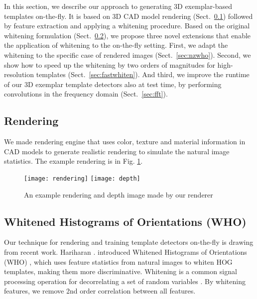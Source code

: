 In this section, we describe our approach to generating 3D
exemplar-based templates on-the-fly. It is based on 3D CAD model
rendering (Sect.~\ref{sec:rendering}) followed by feature extraction
and applying a whitening procedure. Based on the original whitening
formulation (Sect.~\ref{sec:who}), we propose three novel extensions that
enable the application of whitening to the on-the-fly setting.
%
First, we adapt the whitening to the specific case of rendered
images (Sect.~\ref{sec:nzwho}). Second, we show how to speed up the
whitening by two orders of magnitudes for high-resolution templates
(Sect.~\ref{sec:fastwhiten}). And third, we improve the runtime of our
3D exemplar template detectors also at test time, by performing
convolutions in the frequency domain (Sect.~\ref{sec:fft}).


\subsection{Rendering}
\label{sec:rendering}
We made rendering engine that uses color, texture and material information in
CAD models to generate realistic rendering to simulate the natural image
statistics. The example rendering is
in Fig. \ref{fig:rendering}. 

\begin{figure}[t]
  \begin{center}
     \texttt{[image: rendering]}
     \texttt{[image: depth]}
  \end{center}
  \caption{An example rendering and depth image made by our renderer}
  \label{fig:rendering}
\end{figure}


\subsection{Whitened Histograms of Orientations (WHO)}
\label{sec:who}
Our technique for rendering and training template detectors on-the-fly
is drawing from recent work. Hariharan \etal. introduced Whitened Histograms of Orientations (WHO)
\cite{Hariharan12}, which uses feature statistics from natural images to whiten HOG
templates, making them more discriminative. Whitening is a common signal
processing operation for decorrelating a set of random variables
\cite{Martinsson05, Belouchrani00}. By whitening features, we remove 2nd order
correlation between all features. 


